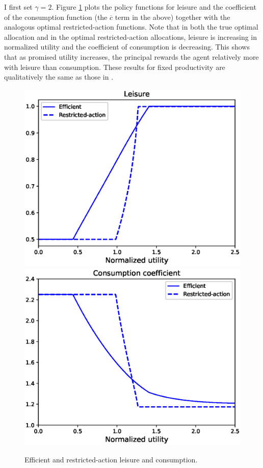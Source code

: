 \documentclass[11pt]{article}
\theoremstyle{plain}
\begin{document}

I first set $\gamma = 2$. Figure \ref{fig:l_c} plots the policy functions for leisure and the coefficient of the consumption function (the $\overline{c}$ term in the above) together with the analogous optimal restricted-action functions. Note that in both the true optimal allocation and in the optimal restricted-action allocations, leisure is increasing in normalized utility and the coefficient of consumption is decreasing. This shows that as promised utility increases, the principal rewards the agent relatively more with leisure than consumption. These results for fixed productivity are qualitatively the same as those in \cite{sannikov_continuous-time_2008}.

\begin{figure}[!htb]
\centering
\includegraphics[width=0.49\linewidth]{leisure_ex}
\includegraphics[width=0.49\linewidth]{consumption_ex}
\caption{Efficient and restricted-action leisure and consumption.}\label{fig:l_c}
\end{figure}
\end{document}
